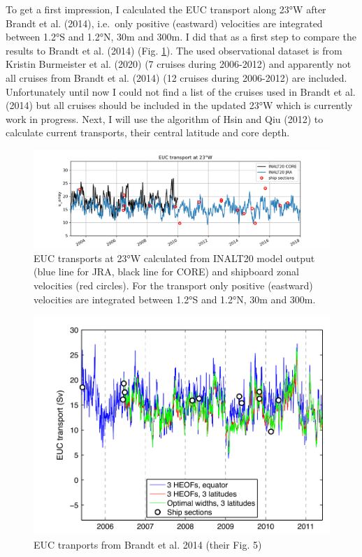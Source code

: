 \documentclass[a4paperpaper,]{article}
\begin{document}
To get a first impression, I calculated the EUC transport along 23°W
after Brandt et al. (2014), i.e.~only positive (eastward) velocities are
integrated between 1.2°S and 1.2°N, 30m and 300m. I did that as a first
step to compare the results to Brandt et al. (2014) (Fig.
\ref{fig_brandt_et_al_2014_fig5}). The used observational dataset is
from Kristin Burmeister et al. (2020) (7 cruises during 2006-2012) and
apparently not all cruises from Brandt et al. (2014) (12 cruises during
2006-2012) are included. Unfortunately until now I could not find a list
of the cruises used in Brandt et al. (2014) but all cruises should be
included in the updated 23°W which is currently work in progress. Next,
I will use the algorithm of Hsin and Qiu (2012) to calculate current
transports, their central latitude and core depth.

\begin{figure}
\centering
\includegraphics{./figures/INALT20_obs_calc_transport_EUC/1_INALT_JRA_CORE_obs_EUC_transp_23W.png}
\caption{EUC transports at 23°W calculated from INALT20 model output
(blue line for JRA, black line for CORE) and shipboard zonal velocities
(red circles). For the transport only positive (eastward) velocities are
integrated between 1.2°S and 1.2°N, 30m and 300m.}
\end{figure}

\begin{figure}
\centering
\includegraphics{./figures/from_literature/Brandt_et_al_2014_fig_5.png}
\caption{EUC tranports from Brandt et al. 2014 (their Fig. 5)
\label{fig_brandt_et_al_2014_fig5}}
\end{figure}
\end{document}
